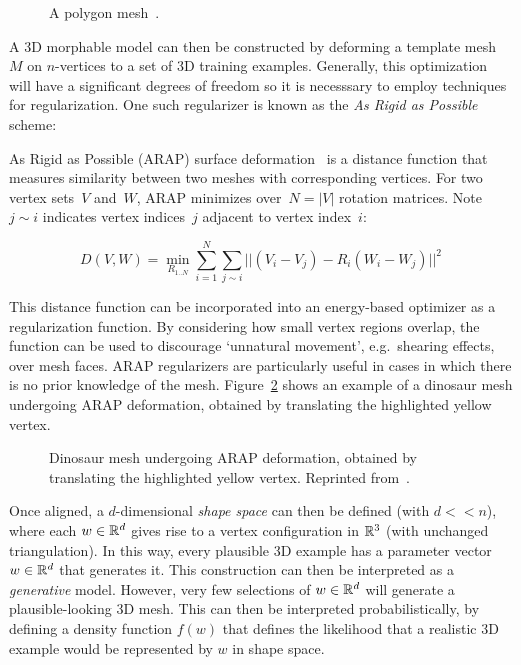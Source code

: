 \begin{figure}[H] %
    \caption{A polygon mesh~\cite{polygon_mesh}.}
    \label{fig:polygon_mesh}
\end{figure}

A 3D morphable model can then be constructed by deforming a template mesh $M$ on $n$-vertices to a set of 3D training examples. Generally, this optimization will have a significant degrees of freedom so it is necesssary to employ techniques for regularization. One such regularizer is known as the \emph{As Rigid as Possible} scheme: 

\begin{definition}
As Rigid as Possible (ARAP) surface deformation~\cite{sorkine2007rigid} is a distance function that measures similarity between two meshes with corresponding vertices. For two vertex sets~$V$ and~$W$, ARAP minimizes over~$N = |V|$ rotation matrices. Note~$j \sim i$ indicates vertex indices~$j$ adjacent to vertex index~$i$:

\begin{equation}
    D(V, W) = \min_{R_{1..N}}\sum_{i=1}^{N}\sum_{j \sim i}|| (V_{i} - V_{j}) - R_{i}(W_{i} - W_{j}) ||^{2}
\end{equation}

This distance function can be incorporated into an energy-based optimizer as a regularization function. By considering how small vertex regions overlap, the function can be used to  discourage `unnatural movement', e.g.\ shearing effects, over mesh faces. ARAP regularizers are particularly useful in cases in which there is no prior knowledge of the mesh. Figure~\ref{fig:arap_dino} shows an example of a dinosaur mesh undergoing ARAP deformation, obtained by translating the highlighted yellow vertex.

\begin{figure}[H] %
    \caption{Dinosaur mesh undergoing ARAP deformation, obtained by translating the highlighted yellow vertex. Reprinted from~\cite{sorkine2007rigid}.}
    \label{fig:arap_dino}
\end{figure}      

\end{definition}

Once aligned, a $d$-dimensional \emph{shape space} can then be defined (with $d << n$), where each $w \in {\mathbb{R}^{d}}$ gives rise to a vertex configuration in ${\mathbb{R}^{3}}$ (with unchanged triangulation). In this way, every plausible 3D example has a parameter vector $w \in {\mathbb{R}^{d}}$ that generates it. This construction can then be interpreted as a \emph{generative} model. However, very few selections of $w \in {\mathbb{R}^{d}}$ will generate a plausible-looking 3D mesh. This can then be interpreted probabilistically, by defining a density function $f(w)$ that defines the likelihood that a realistic 3D example would be represented by $w$ in shape space. 

